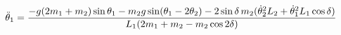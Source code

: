\documentclass[preview]{standalone}
\begin{document}
\begin{align*}
\special{dvisvgm:raw <g id='unique000'>}\ddot{\theta}_1 = \frac{-g(2m_1+m_2)\sin\theta_1- m_2 g\sin(\theta_1-2\theta_2)- 2\sin\delta\, m_2(\dot{\theta}_2^2 L_2+ \dot{\theta}_1^2 L_1 \cos\delta)}{L_1(2m_1+m_2 - m_2\cos 2\delta)}\special{dvisvgm:raw </g>}
\end{align*}
\end{document}
